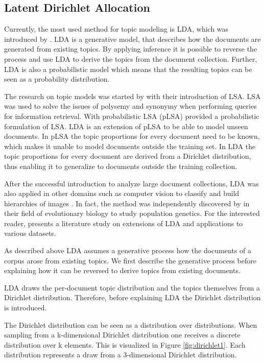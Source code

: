 \subsection{Latent Dirichlet Allocation}
Currently, the most used method for topic modeling is \acl{LDA}, which was introduced by \cite{Blei2003}. \ac{LDA} is a generative model, that describes how the documents are generated from existing topics. By applying inference it is possible to reverse the process and use \ac{LDA} to derive the topics from the document collection. Further, \ac{LDA} is also a probabilistic model which means that the resulting topics can be seen as a probability distribution.

The research on topic models was started by \cite{Deerwester1990} with their introduction of \ac{LSA}. \ac{LSA} was used to solve the issues of polysemy and synonymy when performing queries for information retrieval. With probabilistic \ac{LSA} (pLSA) \cite{Hofmann1999} provided a probabilistic formulation of \ac{LSA}. \ac{LDA} is an extension of pLSA to be able to model unseen documents. In pLSA the topic proportions for every document need to be known, which makes it unable to model documents outside the training set. In \ac{LDA} the topic proportions for every document are derived from a Dirichlet distribution, thus enabling it to generalize to documents outside the training collection.

After the successful introduction to analyze large document collections, \ac{LDA} was also applied in other domains such as computer vision to classify \citep{Fei-Fei2005} and build hierarchies of images \citep{Li2010}. In fact, the method was independently discovered by \cite{Pritchard2000} in their field of evolutionary biology to study population genetics. For the interested reader, \cite{Jelodar2017} presents a literature study on extensions of \ac{LDA} and applications to various datasets.

As described above \ac{LDA} assumes a generative process how the documents of a corpus arose from existing topics. We first describe the generative process before explaining how it can be reversed to derive topics from existing documents.

\ac{LDA} draws the per-document topic distribution and the topics themselves from a  Dirichlet distribution. Therefore, before explaining \ac{LDA} the Dirichlet distribution is introduced. 

The Dirichlet distribution can be seen as a distribution over distributions. When sampling from a k-dimensional Dirichlet distribution one receives a discrete distribution over k elements. This is visualized in Figure \ref{fig:dirichlet1}. Each distribution represents a draw from a 3-dimensional Dirichlet distribution.

